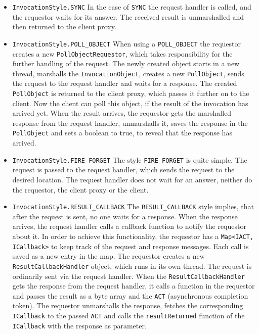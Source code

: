 \begin{itemize}
	\item \texttt{InvocationStyle.SYNC}
	In the case of \texttt{SYNC} the request handler is called, and the requestor waits for its answer. The received result is unmarshalled and then returned to the client proxy. 	
	\item \texttt{InvocationStyle.POLL\_OBJECT}
	When using a \texttt{POLL\_OBJECT} the requestor creates a new \texttt{PollObjectRequestor}, which takes responsibility for the further handling of the request. The newly created object starts in a new thread, marshalls the \texttt{InvocationObject}, creates a new \texttt{PollObject}, sends the request to the request handler and waits for a response. The created \texttt{PollObject} is returned to the client proxy, which passes it further on to the client. Now the client can poll this object, if the result of the invocation has arrived yet. When the result arrives, the requestor gets the marshalled response from the request handler, unmarshalls it, saves the response in the \texttt{PollObject} and sets a boolean to true, to reveal that the response has arrived.
	\item \texttt{InvocationStyle.FIRE\_FORGET}
	The style \texttt{FIRE\_FORGET} is quite simple. The request is passed to the request handler, which sends the request to the desired location. The request handler does not wait for an answer, neither do the requestor, the client proxy or the client.
	\item \texttt{InvocationStyle.RESULT\_CALLBACK}
	The \texttt{RESULT\_CALLBACK} style implies, that after the request is sent, no one waits for a response. When the response arrives, the request handler calls a callback function to notify the requestor about it. In order to achieve this functionality, the requestor has a \texttt{Map<IACT, ICallback>} to keep track of the request and response messages. Each call is saved as a new entry in the map. The requestor creates a new \texttt{ResultCallbackHandler} object, which runs in its own thread. The request is ordinarily sent via the request handler. When the \texttt{ResultCallbackHandler} gets the response from the request handler, it calls a function in the requestor and passes the result as a byte array and the \texttt{ACT} (asynchronous completion token). The requestor unmarshalls the response, fetches the corresponding \texttt{ICallback} to the passed \texttt{ACT} and calls the \texttt{resultReturned} function of the \texttt{ICallback} with the response as parameter.
\end{itemize}

